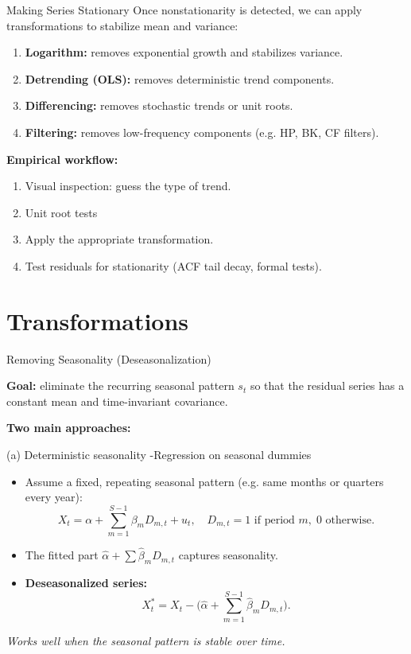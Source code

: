 \documentclass{beamer}
\begin{document}
\begin{frame}{Making Series Stationary}
\small
Once nonstationarity is detected, we can apply transformations to stabilize mean and variance:

\begin{enumerate}
  \item \textbf{Logarithm:} removes exponential growth and stabilizes variance.
  \item \textbf{Detrending (OLS):} removes deterministic trend components.
  \item \textbf{Differencing:} removes stochastic trends or unit roots.
  \item \textbf{Filtering:} removes low-frequency components (e.g. HP, BK, CF filters).
\end{enumerate}

\pause
\textbf{Empirical workflow:}
\begin{enumerate}
  \item Visual inspection: guess the type of trend.
  \item Unit root tests
  \item Apply the appropriate transformation.
  \item Test residuals for stationarity (ACF tail decay, formal tests).
\end{enumerate}


\end{frame}

\section{Transformations}

\begin{frame}{Removing Seasonality (Deseasonalization)}
\footnotesize

\textbf{Goal:} eliminate the recurring seasonal pattern $s_t$ so that the residual series
has a constant mean and time-invariant covariance.

\vspace{0.2cm}
\textbf{Two main approaches:}

\vspace{0.3cm}
\begin{block}{(a) Deterministic seasonality -Regression on seasonal dummies}
\begin{itemize}
  \item Assume a fixed, repeating seasonal pattern (e.g. same months or quarters every year):
  \[
  X_t = \alpha + \sum_{m=1}^{S-1}\beta_m D_{m,t} + u_t,
  \quad D_{m,t}=1 \text{ if period } m, \; 0 \text{ otherwise.}
  \]
  \item The fitted part $\hat\alpha + \sum \hat\beta_m D_{m,t}$ captures seasonality.
  \item \textbf{Deseasonalized series:}
  \[
  X_t^* = X_t - \big(\hat\alpha + \sum_{m=1}^{S-1}\hat\beta_m D_{m,t}\big).
  \]
\end{itemize}
\textit{Works well when the seasonal pattern is stable over time.}
\end{block}
\end{frame}
\end{document}
